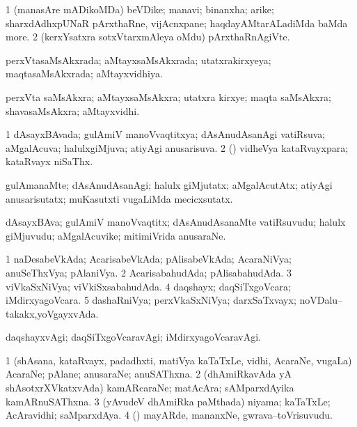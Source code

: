\bentry
{}
\gl{\nA}
\bmng
\bnum
\num{1} (manasAre mADikoMDa) beVDike; manavi; binanxha; arike; sharxdAdhxpUNaR pArxthaRne, vijAcnxpane; haqdayAMtarALadiMda baMda more. 
\num{2} (kerxYsatxra sotxVtarxmAleya oMdu) pArxthaRnAgiVte. 
\enum
\emng
\eentry

\bentry
{}
\gl{\gu}
\bmng
perxVtasaMsAkxrada; aMtayxsaMsAkxrada; utatxrakirxyeya; maqtasaMsAkxrada; aMtayxvidhiya. 
\emng
\eentry

\bentry
{}
\gl{\nA}
\bmng
perxVta saMsAkxra; aMtayxsaMsAkxra; utatxra kirxye; maqta saMsAkxra; shavasaMsAkxra; aMtayxvidhi. 
\emng
\eentry

\bentry
{}
\gl{\gu}
\bmng
\bnum
\num{1} dAsayxBAvada; gulAmiV manoVvaqtitxya; dAsAnudAsanAgi vatiRsuva; aMgalAcuva; halulxgiMjuva; atiyAgi anusarisuva. 
\num{2} (\pArxparx) vidheVya kataRvayxpara; kataRvayx niSaThx. 
\enum
\emng
\eentry

\bentry
{}
\gl{\kirxvi}
\bmng
gulAmanaMte; dAsAnudAsanAgi; halulx giMjutatx; aMgalAcutAtx; atiyAgi anusarisutatx; muKasutxti \mo vugaLiMda mecicxsutatx. 
\emng
\eentry

\bentry
{}
\gl{\nA}
\bmng
dAsayxBAva; gulAmiV manoVvaqtitx; dAsAnudAsanaMte vatiRsuvudu; halulx giMjuvudu; aMgalAcuvike; mitimiVrida anusaraNe. 
\emng
\eentry

\bentry
{}
\gl{\gu}
\bmng
\bnum
\num{1} naDesabeVkAda; AcarisabeVkAda; pAlisabeVkAda; AcaraNiVya; anuSeThxVya; pAlaniVya. 
\num{2} AcarisabahudAda; pAlisabahudAda. 
\num{3} viVkaSxNiVya; viVkiSxsabahudAda. 
\num{4} daqshayx; daqSiTxgoVcara; iMdirxyagoVcara. 
\num{5} dashaRniVya; perxVkaSxNiVya; darxSaTxvayx; noVDalu--takakx,yoVgayxvAda. 
\enum
\emng
\eentry

\bentry
{}
\gl{\kirxvi}
\bmng
daqshayxvAgi; daqSiTxgoVcaravAgi; iMdirxyagoVcaravAgi. 
\emng
\eentry

\bentry
{}
\gl{\nA}
\bmng
\bnum
\num{1} (shAsana, kataRvayx, padadhxti, matiVya kaTaTxLe, vidhi, AcaraNe, \mo vugaLa) AcaraNe; pAlane; anusaraNe; anuSAThxna. 
\num{2} (dhAmiRkavAda yA shAsotxrXVkatxvAda) kamARcaraNe; matAcAra; sAMparxdAyika kamARnuSAThxna. 
\num{3} (yAvudeV dhAmiRka paMthada) niyama; kaTaTxLe; AcAravidhi; saMparxdAya. 
\num{4} (\pArxparx) mayARde, mananxNe, gwrava--toVrisuvudu. 
\enum
\emng
\eentry

